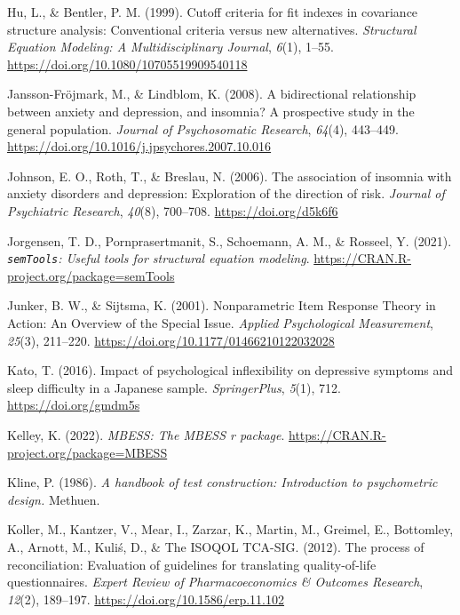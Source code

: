 \documentclass[
  ,doc,11pt, twoside,floatsintext]{apa6}
\newlength{\cslhangindent}
\newlength{\cslentryspacingunit} %
\newenvironment{CSLReferences}[2] %
 {%
  \setlength{\parindent}{0pt}
  \ifodd #1
  \let\oldpar\par
  \def\par{\hangindent=\cslhangindent\oldpar}
  \fi
  \setlength{\parskip}{#2\cslentryspacingunit}
 }%
 {}
\begin{document}
\begin{CSLReferences}{1}{0}
\leavevmode{}%
Hu, L., \& Bentler, P. M. (1999). Cutoff criteria for fit indexes in covariance structure analysis: {Conventional} criteria versus new alternatives. \emph{Structural Equation Modeling: A Multidisciplinary Journal}, \emph{6}(1), 1--55. \url{https://doi.org/10.1080/10705519909540118}

\leavevmode{}%
Jansson-Fröjmark, M., \& Lindblom, K. (2008). A bidirectional relationship between anxiety and depression, and insomnia? {A} prospective study in the general population. \emph{Journal of Psychosomatic Research}, \emph{64}(4), 443--449. \url{https://doi.org/10.1016/j.jpsychores.2007.10.016}

\leavevmode{}%
Johnson, E. O., Roth, T., \& Breslau, N. (2006). The association of insomnia with anxiety disorders and depression: Exploration of the direction of risk. \emph{Journal of Psychiatric Research}, \emph{40}(8), 700--708. \url{https://doi.org/d5k6f6}

\leavevmode{}%
Jorgensen, T. D., Pornprasertmanit, S., Schoemann, A. M., \& Rosseel, Y. (2021). \emph{\texttt{semTools}: {U}seful tools for structural equation modeling}. \url{https://CRAN.R-project.org/package=semTools}

\leavevmode{}%
Junker, B. W., \& Sijtsma, K. (2001). Nonparametric {Item Response Theory} in {Action}: {An Overview} of the {Special Issue}. \emph{Applied Psychological Measurement}, \emph{25}(3), 211--220. \url{https://doi.org/10.1177/01466210122032028}

\leavevmode{}%
Kato, T. (2016). Impact of psychological inflexibility on depressive symptoms and sleep difficulty in a {Japanese} sample. \emph{SpringerPlus}, \emph{5}(1), 712. \url{https://doi.org/gmdm5s}

\leavevmode{}%
Kelley, K. (2022). \emph{MBESS: The MBESS r package}. \url{https://CRAN.R-project.org/package=MBESS}

\leavevmode{}%
Kline, P. (1986). \emph{A handbook of test construction: Introduction to psychometric design.} Methuen.

\leavevmode{}%
Koller, M., Kantzer, V., Mear, I., Zarzar, K., Martin, M., Greimel, E., Bottomley, A., Arnott, M., Kuliś, D., \& The ISOQOL TCA-SIG. (2012). The process of reconciliation: Evaluation of guidelines for translating quality-of-life questionnaires. \emph{Expert Review of Pharmacoeconomics \& Outcomes Research}, \emph{12}(2), 189--197. \url{https://doi.org/10.1586/erp.11.102}


\end{CSLReferences}
\end{document}
